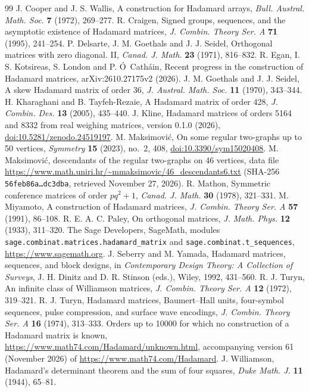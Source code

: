 \documentclass[10pt]{article}
\theoremstyle{definition}
\theoremstyle{remark}
\begin{document}
\begin{thebibliography}{99}\small
{} J. Cooper and J. S. Wallis, A construction for Hadamard arrays, \emph{Bull. Austral. Math. Soc.} \textbf{7} (1972), 269--277.
 R. Craigen, Signed groups, sequences, and the asymptotic existence of Hadamard matrices, \emph{J. Combin. Theory Ser. A} \textbf{71} (1995), 241--254.
 P. Delsarte, J. M. Goethals and J. J. Seidel, Orthogonal matrices with zero diagonal. II, \emph{Canad. J. Math.} \textbf{23} (1971), 816--832.
 R. Egan, I. S. Kotsireas, S. London and P. \'O~Cath\'ain, Recent progress in the construction of Hadamard matrices, arXiv:2610.27175v2 (2026).
 J. M. Goethals and J. J. Seidel, A skew Hadamard matrix of order 36, \emph{J. Austral. Math. Soc.} \textbf{11} (1970), 343--344.
 H. Kharaghani and B. Tayfeh-Rezaie, A Hadamard matrix of order 428, \emph{J. Combin. Des.} \textbf{13} (2005), 435--440.
 J. Kline, Hadamard matrices of orders 5164 and 8332 from real weighing matrices, version 0.1.0 (2026), \href{https://doi.org/10.5281/zenodo.24519197}{doi:10.5281/zenodo.24519197}.
 M. Maksimovi\'c, On some regular two-graphs up to 50 vertices, \emph{Symmetry} \textbf{15} (2023), no.~2, 408, \href{https://doi.org/10.3390/sym15020408}{doi:10.3390/sym15020408}.
 M. Maksimovi\'c, descendants of the regular two-graphs on 46 vertices, data file \url{https://www.math.uniri.hr/~mmaksimovic/46_descendants6.txt} (SHA-256 \texttt{56feb86a\ldots dc3dba}, retrieved November 27, 2026).
 R. Mathon, Symmetric conference matrices of order $pq^2+1$, \emph{Canad. J. Math.} \textbf{30} (1978), 321--331.
 M. Miyamoto, A construction of Hadamard matrices, \emph{J. Combin. Theory Ser. A} \textbf{57} (1991), 86--108.
 R. E. A. C. Paley, On orthogonal matrices, \emph{J. Math. Phys.} \textbf{12} (1933), 311--320.
 The Sage Developers, SageMath, modules \texttt{sage.combinat.matrices.hadamard\_matrix} and \texttt{sage.combinat.t\_sequences}, \url{https://www.sagemath.org}.
 J. Seberry and M. Yamada, Hadamard matrices, sequences, and block designs, in \emph{Contemporary Design Theory: A Collection of Surveys}, J. H. Dinitz and D. R. Stinson (eds.), Wiley, 1992, 431--560.
 R. J. Turyn, An infinite class of Williamson matrices, \emph{J. Combin. Theory Ser. A} \textbf{12} (1972), 319--321.
 R. J. Turyn, Hadamard matrices, Baumert--Hall units, four-symbol sequences, pulse compression, and surface wave encodings, \emph{J. Combin. Theory Ser. A} \textbf{16} (1974), 313--333.
 Orders up to 10000 for which no construction of a Hadamard matrix is known, \url{https://www.math74.com/Hadamard/unknown.html}, accompanying version 61 (November 2026) of \url{https://www.math74.com/Hadamard}.
 J. Williamson, Hadamard's determinant theorem and the sum of four squares, \emph{Duke Math. J.} \textbf{11} (1944), 65--81.
\end{thebibliography}
\end{document}
